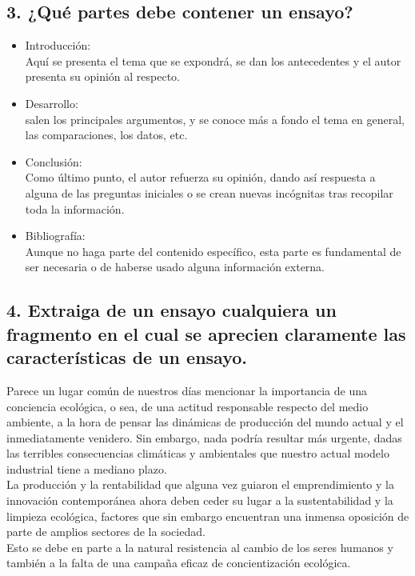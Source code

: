\documentclass[a4paper,man,natbib]{apa6}
\begin{document}
\subsection{3. ¿Qué partes debe contener un ensayo?}
\begin{itemize}
    \item Introducción:\\ Aquí se presenta el tema que se expondrá, se dan los antecedentes y el autor presenta su opinión al respecto.
    \item Desarrollo: \\ salen los principales argumentos, y se conoce más a fondo el tema en general, las comparaciones, los datos, etc.
    \item Conclusión: \\ Como último punto, el autor refuerza su opinión, dando así respuesta a alguna de las preguntas iniciales o se crean nuevas incógnitas tras recopilar toda la información.
    \item Bibliografía: \\ Aunque no haga parte del contenido específico, esta parte es fundamental de ser necesaria o de haberse usado alguna información externa.
\end{itemize}

\subsection{4. Extraiga de un ensayo cualquiera un fragmento en el cual se aprecien claramente las características de un ensayo.}

Parece un lugar común de nuestros días mencionar la importancia de una conciencia ecológica, o sea, de una actitud responsable respecto del medio ambiente, a la hora de pensar las dinámicas de producción del mundo actual y el inmediatamente venidero. Sin embargo, nada podría resultar más urgente, dadas las terribles consecuencias climáticas y ambientales que nuestro actual modelo industrial tiene a mediano plazo.\\

La producción y la rentabilidad que alguna vez guiaron el emprendimiento y la innovación contemporánea ahora deben ceder su lugar a la sustentabilidad y la limpieza ecológica, factores que sin embargo encuentran una inmensa oposición de parte de amplios sectores de la sociedad. \\
Esto se debe en parte a la natural resistencia al cambio de los seres humanos y también a la falta de una campaña eficaz de concientización ecológica.\\
\citep{ensayoEjemplo}


\end{document}
